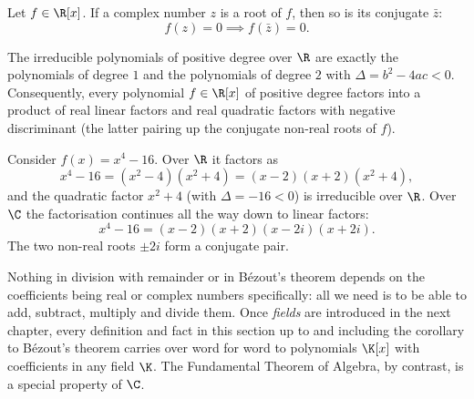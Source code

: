 \begin{theorem}
Let $f\in \R[x]$. If a complex number $z$ is a root of $f$, then so is its conjugate $\bar z$:
\[
f(z)=0 \implies f(\bar{z})=0.
\]
\end{theorem}

\begin{corollary}
The irreducible polynomials of positive degree over $\R$ are exactly the polynomials of degree $1$ and the
polynomials of degree $2$ with $\Delta = b^2-4ac<0$. Consequently, every polynomial $f\in\R[x]$ of positive
degree factors into a product of real linear factors and real quadratic factors with negative discriminant
(the latter pairing up the conjugate non-real roots of $f$).
\end{corollary}

\begin{example}
Consider $f(x) = x^4-16$. Over $\R$ it factors as
\[
x^4-16 = (x^2-4)(x^2+4) = (x-2)(x+2)(x^2+4),
\]
and the quadratic factor $x^2+4$ (with $\Delta = -16<0$) is irreducible over $\R$. Over $\C$ the
factorisation continues all the way down to linear factors:
\[
x^4-16 = (x-2)(x+2)(x-2i)(x+2i).
\]
The two non-real roots $\pm 2i$ form a conjugate pair.
\end{example}

\begin{remark}
Nothing in division with remainder or in Bézout's theorem depends on the coefficients being real or complex
numbers specifically: all we need is to be able to add, subtract, multiply and divide them. Once
\emph{fields} are introduced in the next chapter, every definition and fact in this section up to and
including the corollary to Bézout's theorem carries over word for word to polynomials $\K[x]$ with
coefficients in any field $\K$. The Fundamental Theorem of Algebra, by contrast, is a special property of
$\C$.
\end{remark}
